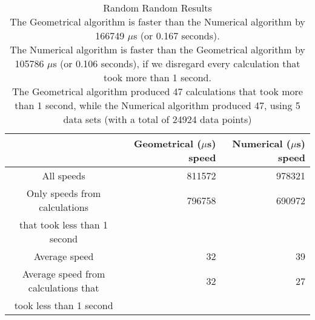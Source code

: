 \begin{table}[bth!]\footnotesize
 \begin{tabular}[3]{c|r|r}
 & Geometrical ($\mu$s) speed & Numerical ($\mu$s) speed\\
\hline
All speeds & 811572 & 978321 \\ 
\hline 
Only speeds from calculations & 796758 & 690972 \\ 
that took less than 1 second & & \\ 
\hline
Average speed & 32 & 39 \\
\hline
Average speed from calculations that & 32 & 27 \\ 
took less than 1 second & & \\ 
\end{tabular}\\ \\
\caption{Random Random Results\\
The Geometrical algorithm is faster than the Numerical algorithm by 166749 $\mu$s (or 0.167 seconds).\\
The Numerical algorithm is faster than the Geometrical algorithm by 105786 $\mu$s (or 0.106 seconds), if we disregard every calculation that took more than 1 second.\\
The Geometrical algorithm produced 47 calculations that took more than 1 second, while the Numerical algorithm produced 47, using 5 data sets (with a total of 24924 data points)\\
}\label{random-random_speedtable}\end{table}